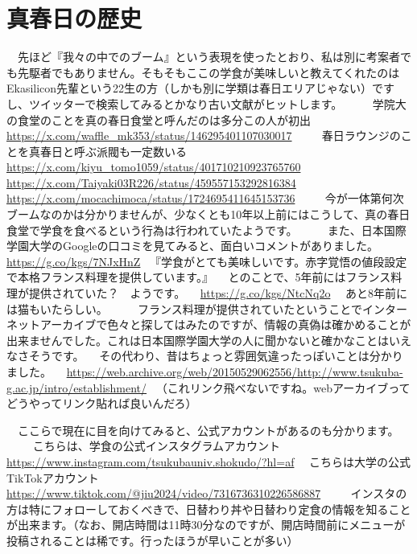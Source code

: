 \documentclass[
paper=a6,
fontsize=7pt,jafontsize=7pt,
baselineskip=1.6zh,
book,
hanging_punctuation,
head_space=10truemm,foot_space=10truemm
]{jlreq}
\begin{document}
\chapter{真春日の歴史}
　先ほど『我々の中でのブーム』という表現を使ったとおり、私は別に考案者でも先駆者でもありません。そもそもここの学食が美味しいと教えてくれたのはEkasilicon先輩という22生の方（しかも別に学類は春日エリアじゃない）ですし、ツイッターで検索してみるとかなり古い文献がヒットします。
　
　学院大の食堂のことを真の春日食堂と呼んだのは多分この人が初出
　\url{https://x.com/waffle_mk353/status/146295401107030017}
　
　春日ラウンジのことを真春日と呼ぶ派閥も一定数いる
　\url{https://x.com/kiyu_tomo1059/status/401710210923765760}
　\url{https://x.com/Taiyaki03R226/status/459557153292816384}
　\url{https://x.com/mocachimoca/status/1724695411645153736}
　
　今が一体第何次ブームなのかは分かりませんが、少なくとも10年以上前にはこうして、真の春日食堂で学食を食べるという行為は行われていたようです。
　
　また、日本国際学園大学のGoogleの口コミを見てみると、面白いコメントがありました。
　\url{https://g.co/kgs/7NJxHnZ}
　『学食がとても美味しいです。赤字覚悟の値段設定で本格フランス料理を提供しています。』
　とのことで、5年前にはフランス料理が提供されていた？　ようです。
　\url{https://g.co/kgs/NtcNq2o}
　あと8年前には猫もいたらしい。
　
　フランス料理が提供されていたということでインターネットアーカイブで色々と探してはみたのですが、情報の真偽は確かめることが出来ませんでした。これは日本国際学園大学の人に聞かないと確かなことはいえなさそうです。
　その代わり、昔はちょっと雰囲気違ったっぽいことは分かりました。
　\url{https://web.archive.org/web/20150529062556/http://www.tsukuba-g.ac.jp/intro/establishment/}
　（これリンク飛べないですね。webアーカイブってどうやってリンク貼れば良いんだろ）

　ここらで現在に目を向けてみると、公式アカウントがあるのも分かります。
　
　こちらは、学食の公式インスタグラムアカウント
　\url{https://www.instagram.com/tsukubauniv.shokudo/?hl=af}
　こちらは大学の公式TikTokアカウント
　\url{https://www.tiktok.com/@jiu2024/video/7316736310226586887}
　
　インスタの方は特にフォローしておくべきで、日替わり丼や日替わり定食の情報を知ることが出来ます。（なお、開店時間は11時30分なのですが、開店時間前にメニューが投稿されることは稀です。行ったほうが早いことが多い）
\end{document}
